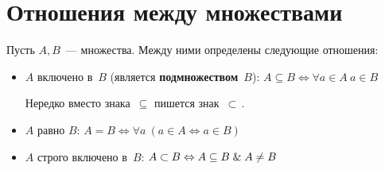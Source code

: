 \section{Отношения между множествами}
Пусть $A, B$~--- множества. Между ними определены следующие отношения:
\begin{itemize}
	\item $A$ включено в~$B$ (является \textbf{подмножеством}~$B$): $A \subseteq B \Leftrightarrow \forall a \in A \ a \in B$
	
	Нередко вместо знака~$\subseteq$ пишется знак~$\subset$\,.
	\item $A$ равно $B$: $A = B \Leftrightarrow \forall a \ (a \in A \Leftrightarrow a \in B)$
	\item $A$ строго включено в~$B$: $A \subset B \Leftrightarrow A \subseteq B \mathrel{\&} A \neq B$
\end{itemize}